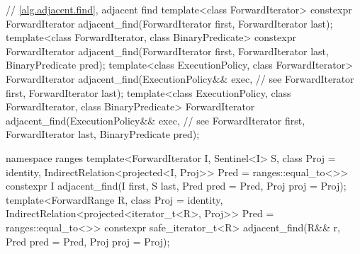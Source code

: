 \begin{codeblock}
  // \ref{alg.adjacent.find}, adjacent find
  template<class ForwardIterator>
    constexpr ForwardIterator
      adjacent_find(ForwardIterator first, ForwardIterator last);
  template<class ForwardIterator, class BinaryPredicate>
    constexpr ForwardIterator
      adjacent_find(ForwardIterator first, ForwardIterator last,
                    BinaryPredicate pred);
  template<class ExecutionPolicy, class ForwardIterator>
    ForwardIterator
      adjacent_find(ExecutionPolicy&& exec, // see 
                    ForwardIterator first, ForwardIterator last);
  template<class ExecutionPolicy, class ForwardIterator, class BinaryPredicate>
    ForwardIterator
      adjacent_find(ExecutionPolicy&& exec, // see 
                    ForwardIterator first, ForwardIterator last,
                    BinaryPredicate pred);
\end{codeblock}\begin{addedblock}\begin{codeblock}
  namespace ranges {
    template<ForwardIterator I, Sentinel<I> S, class Proj = identity,
        IndirectRelation<projected<I, Proj>> Pred = ranges::equal_to<>>
      constexpr I adjacent_find(I first, S last, Pred pred = Pred{},
                                Proj proj = Proj{});
    template<ForwardRange R, class Proj = identity,
        IndirectRelation<projected<iterator_t<R>, Proj>> Pred = ranges::equal_to<>>
      constexpr safe_iterator_t<R>
        adjacent_find(R&& r, Pred pred = Pred{}, Proj proj = Proj{});
  }
\end{codeblock}\end{addedblock}\begin{codeblock}


\end{codeblock}
